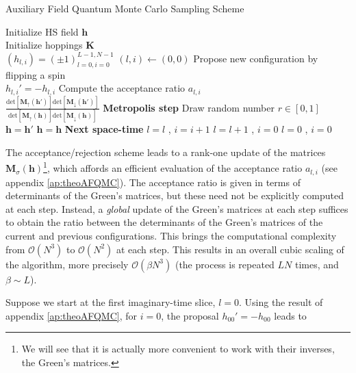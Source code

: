 \begin{algorithm}
\caption{Auxiliary Field Quantum Monte Carlo Sampling Scheme}
\label{afqmcSampling}
\begin{algorithmic}[5]
  \STATE Initialize HS field $\bm h$  \\
  \STATE Initialize hoppings $\bm K$  \\
  \STATE  $(h_{l, i}) = (\pm 1)_{l=0, i = 0}^{L-1, N-1}$
  \STATE $(l, i) \leftarrow (0, 0)$
  \STATE \footnotesize{Propose new configuration by flipping a spin} \\ \normalsize{$h_{l, i}' = - h_{l, i}$} 
  \STATE \footnotesize{Compute the acceptance ratio $a_{l, i}$} \\
  \normalsize{$\frac{\text{det}[\bm M_\uparrow (\bm h')]\text{det}[\bm M_\downarrow (\bm h')]}{\text{det}[\bm M_\uparrow (\bm h)]\text{det}[\bm M_\downarrow (\bm h)]}$}
  \STATE \textbf{\normalsize{Metropolis step}}
  \STATE \footnotesize{Draw random number $r \in [0,1]$}
  \STATE $\bm h = \bm h'$
  \ELSE
  \STATE $\bm h = \bm h$
  \ENDIF
  \STATE \textbf{Next space-time }
  \STATE $l = l$ , $i = i +1 $
  \ELSE
  \STATE $l = l+1$ , $i = 0 $
  \ENDIF
  \STATE $l = 0$ , $i=0$
  \ENDIF
  \ENDIF
  \ENDFOR
\end{algorithmic}
\end{algorithm}

The acceptance/rejection scheme leads to a rank-one update of the matrices $\bm M_\sigma (\bm h)$\footnote{We will see that it is actually more convenient to work with their inverses, the Green's matrices.}, which affords an efficient evaluation of the acceptance ratio $a_{l, i}$ \cite{hou_numerical_2009} (see appendix \ref{ap:theoAFQMC}).
The acceptance ratio is given in terms of determinants of the Green's matrices, but these need not be explicitly computed at each step.
Instead, a \emph{global} update of the Green's matrices at each step suffices to obtain the ratio between the determinants of the Green's matrices of the current and previous configurations.
This brings the computational complexity from $\mathcal{O}(N^3)$ to $\mathcal{O}(N^2)$ at each step.
This results in an overall cubic scaling of the algorithm, more precisely $\mathcal{O}(\beta N^3)$ (the process is repeated $L N$ times, and $\beta \sim L$).

Suppose we start at the first imaginary-time slice, $l = 0$.
Using the result of appendix \ref{ap:theoAFQMC}, for $i = 0$, the proposal $h_{0 0}' = - h_{0 0}$ leads to

